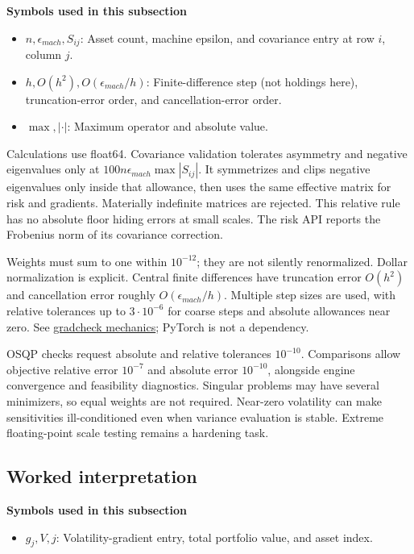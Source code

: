 \documentclass[
  american,
  11pt,
]{article}
\begin{document}
\textbf{Symbols used in this subsection}
\begin{itemize}
\item \(n,\epsilon_{mach},S_{ij}\): Asset count, machine epsilon, and covariance entry at row $i$, column $j$.
\item \(h,O(h^2),O(\epsilon_{mach}/h)\): Finite-difference step (not holdings here), truncation-error order, and cancellation-error order.
\item \(\max,|\cdot|\): Maximum operator and absolute value.
\end{itemize}


Calculations use float64. Covariance validation tolerates asymmetry and
negative eigenvalues only at \(100n\epsilon_{mach}\max|S_{ij}|\). It
symmetrizes and clips negative eigenvalues only inside that allowance,
then uses the same effective matrix for risk and gradients. Materially
indefinite matrices are rejected. This relative rule has no absolute
floor hiding errors at small scales. The risk API reports the Frobenius
norm of its covariance correction.

Weights must sum to one within \(10^{-12}\); they are not silently
renormalized. Dollar normalization is explicit. Central finite
differences have truncation error \(O(h^2)\) and cancellation error
roughly \(O(\epsilon_{mach}/h)\). Multiple step sizes are used, with
relative tolerances up to \(3\cdot10^{-6}\) for coarse steps and
absolute allowances near zero. See
\href{https://docs.pytorch.org/docs/2.14/notes/gradcheck.html}{gradcheck
mechanics}; PyTorch is not a dependency.

OSQP checks request absolute and relative tolerances \(10^{-10}\).
Comparisons allow objective relative error \(10^{-7}\) and absolute
error \(10^{-10}\), alongside engine convergence and feasibility
diagnostics. Singular problems may have several minimizers, so equal
weights are not required. Near-zero volatility can make sensitivities
ill-conditioned even when variance evaluation is stable. Extreme
floating-point scale testing remains a hardening task.

\subsection{Worked interpretation}\label{worked-interpretation}

\textbf{Symbols used in this subsection}
\begin{itemize}
\item \(g_j,V,j\): Volatility-gradient entry, total portfolio value, and asset index.
\end{itemize}
\end{document}
